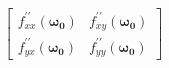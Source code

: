 \documentclass[preview]{standalone}
\begin{document}
\begin{align*}
\begin{bmatrix} f_{xx}^{\prime \prime}(\mathbf{\omega_0}) & f_{xy}^{\prime \prime}(\mathbf{\omega_0}) \\ f_{yx}^{\prime \prime}(\mathbf{\omega_0}) & f_{yy}^{\prime \prime}(\mathbf{\omega_0}) \end{bmatrix}
\end{align*}
\end{document}
